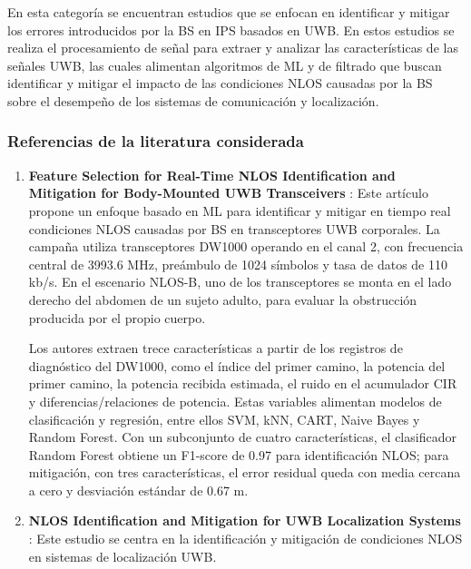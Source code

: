 En esta categoría se encuentran estudios que se enfocan en identificar y mitigar los errores introducidos por la BS en IPS basados en UWB. En estos estudios se realiza el procesamiento de señal para extraer y analizar las características de las señales UWB, las cuales alimentan algoritmos de ML y de filtrado que buscan identificar y mitigar el impacto de las condiciones NLOS causadas por la BS sobre el desempeño de los sistemas de comunicación y localización.

\subsubsection{Referencias de la literatura considerada}


\begin{enumerate}
    \item \textbf{Feature Selection for Real-Time NLOS Identification and Mitigation for Body-Mounted UWB Transceivers} \cite{Ferreira2021}: Este artículo propone un enfoque basado en ML para identificar y mitigar en tiempo real condiciones NLOS causadas por BS en transceptores UWB corporales. La campaña utiliza transceptores DW1000 operando en el canal 2, con frecuencia central de 3993.6 MHz, preámbulo de 1024 símbolos y tasa de datos de 110 kb/s. En el escenario NLOS-B, uno de los transceptores se monta en el lado derecho del abdomen de un sujeto adulto, para evaluar la obstrucción producida por el propio cuerpo.
    
    Los autores extraen trece características a partir de los registros de diagnóstico del DW1000, como el índice del primer camino, la potencia del primer camino, la potencia recibida estimada, el ruido en el acumulador CIR y diferencias/relaciones de potencia. Estas variables alimentan modelos de clasificación y regresión, entre ellos SVM, kNN, CART, Naive Bayes y Random Forest. Con un subconjunto de cuatro características, el clasificador Random Forest obtiene un F1-score de 0.97 para identificación NLOS; para mitigación, con tres características, el error residual queda con media cercana a cero y desviación estándar de 0.67 m.
    
    \item \textbf{NLOS Identification and Mitigation for UWB Localization Systems} \cite{Guvenc}: Este estudio se centra en la identificación y mitigación de condiciones NLOS en sistemas de localización UWB.
    

\end{enumerate}
